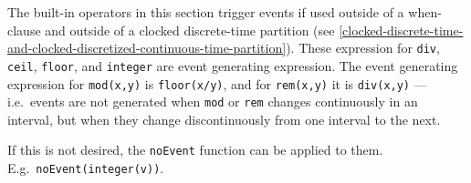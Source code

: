 The built-in operators in this section trigger events if used outside of
a when-clause and outside of a clocked discrete-time partition (see
\autoref{clocked-discrete-time-and-clocked-discretized-continuous-time-partition}).
These expression for \lstinline!div!, \lstinline!ceil!, \lstinline!floor!, and \lstinline!integer! are
event generating expression. The event generating expression for
\lstinline!mod(x,y)! is \lstinline!floor(x/y)!, and for \lstinline!rem(x,y)! it is \lstinline!div(x,y)! --- i.e.\ events
are not generated when \lstinline!mod! or \lstinline!rem! changes continuously in an interval,
but when they change discontinuously from one interval to the next.

\begin{nonnormative}
If this is not desired, the \lstinline!noEvent! function can be applied to them.  E.g.\ \lstinline!noEvent(integer(v))!.
\end{nonnormative}


